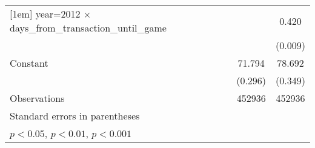 {\begin{tabular}{l*{2}{c}}
[1em]
year=2012 $\times$ days\_from\_transaction\_until\_game&                     &       0.420\sym{***}\\
                    &                     &     (0.009)         \\
[1em]
Constant            &      71.794\sym{***}&      78.692\sym{***}\\
                    &     (0.296)         &     (0.349)         \\
\hline
Observations        &      452936         &      452936         \\
\hline\hline
\multicolumn{3}{l}{\footnotesize Standard errors in parentheses}\\
\multicolumn{3}{l}{\footnotesize \sym{*} \(p<0.05\), \sym{**} \(p<0.01\), \sym{***} \(p<0.001\)}\\
\end{tabular}
}
